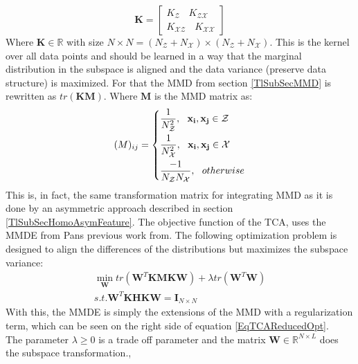 \begin{equation}\label{EqTCAKernel}
\mathbf{K} = 
	\begin{bmatrix}
	K_{\mathcal{Z}}\>\>\>\> K_{\mathcal{ZX}} \\
	K_{\mathcal{XZ}}\>\>\>\> K_{\mathcal{XX}}
	\end{bmatrix}
\end{equation}
Where $\mathbf{K} \in \mathbb{R}$ with size $N\times N = (N_\mathcal{Z} + N_\mathcal{X}) \times (N_\mathcal{Z}+ N_\mathcal{X})$.
This is the kernel over all data points and should be learned in a way that the marginal distribution in the subspace is aligned and the data variance (preserve data structure) is maximized.
For that the \acs{MMD} from section \ref{TlSubSecMMD} is rewritten as $tr(\mathbf{KM})$.
Where $\mathbf{M}$ is the \acs{MMD} matrix as:\cite{Pan.2011}
\begin{equation}\label{EqTCAMMD}
(M)_{ij}= \begin{dcases}
\frac{1}{N_\mathcal{Z}^2},\>\>\> \mathbf{x_i},\mathbf{x_j} \in \mathcal{Z}\\
\frac{1}{N_\mathcal{X}^2},\>\>\> \mathbf{x_i},\mathbf{x_j} \in \mathcal{X}\\
\frac{-1}{N_\mathcal{Z}N_\mathcal{X}},\>\>\> otherwise
\end{dcases}
\end{equation}
This is, in fact, the same transformation matrix for integrating \acs{MMD} as it is done by an asymmetric approach described in section \ref{TlSubSecHomoAsymFeature}.
The objective function of the \acs{TCA}, uses the \ac{MMDE} from Pans previous work from\cite{Pan.2008}. The following optimization problem is designed to align the differences of the distributions but maximizes the subspace variance:\cite{Pan.2011}
\begin{equation}\label{EqTCAReducedOpt}
\begin{gathered}
\min_{\mathbf{W}}  tr(\mathbf{W}^T\mathbf{KMKW}) + \lambda tr(\mathbf{W}^T\mathbf{W})\\
s.t. \mathbf{W}^T\mathbf{KHKW} = \mathbf{I}_{N \times N}
\end{gathered}
\end{equation}
With this, the \acs{MMDE} is simply the extensions of the \acl{MMD} with a regularization term, which can be seen on the right side of equation \eqref{EqTCAReducedOpt}.\cite{Pan.2011}\\
The parameter $\lambda \ge 0$ is a trade off parameter and the matrix $\mathbf{W} \in \mathbb{R}^{N\times L}$ does the subspace transformation.\cite{Pan.2011},\\
